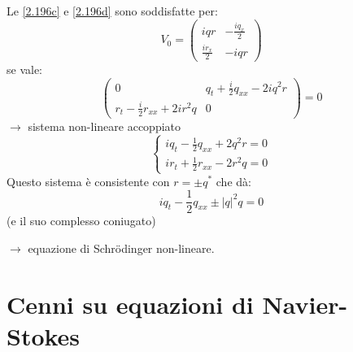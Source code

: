 \documentclass[a4paper,11pt]{report}
\begin{document}
Le \eqref{2.196c} e \eqref{2.196d} sono soddisfatte per:
\[
V_0=\left(\begin{matrix}
iqr & - \frac{iq_x}{2} \\
\frac{ir_x}{2} & - iqr
\end{matrix}\right)
\]
se vale:
\[
\left(\begin{matrix}
0 & q_t + \frac{i}{2}q_{xx} - 2iq^2 r \\
r_t - \frac{i}{2}r_{xx} + 2ir^2 q & 0
\end{matrix}\right)=0
\]
$\rightarrow$ sistema non-lineare accoppiato
\[
\begin{cases}
iq_t - \frac{1}{2}q_{xx} + 2 q^2 r=0\\
ir_t + \frac{1}{2} r_{xx} -2 r^2 q =0 
\end{cases}
\]
Questo sistema \`e consistente con $r=\pm q^*$ che d\`a:
\[
iq_t - \frac{1}{2}q_{xx}\pm |q|^2 q=0
\]
(e il suo complesso coniugato)

$\rightarrow$ equazione di Schr\"odinger non-lineare.

\section{Cenni su equazioni di Navier-Stokes}
\end{document}
